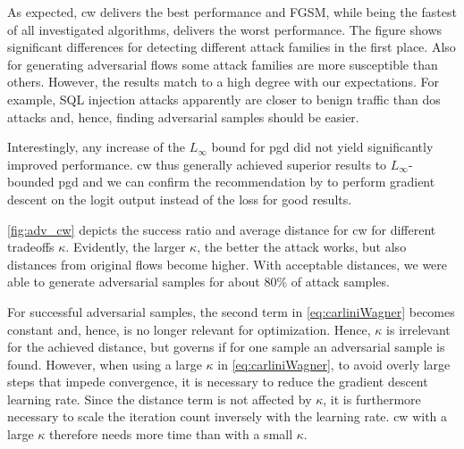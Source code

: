 \documentclass[conference]{IEEEtran}
\begin{document}
As expected, \gls{cw} delivers the best performance and FGSM, while being the fastest of all investigated algorithms, delivers the worst performance.
The figure shows significant differences for detecting different attack families in the first place. Also for generating adversarial flows some attack families are more susceptible than others. However, the results match to a high degree with our expectations. For example, SQL injection attacks apparently are closer to benign traffic than \gls{dos} attacks and, hence, finding adversarial samples should be easier.

Interestingly, any increase of the $L_\infty$ bound for \gls{pgd} did not yield significantly improved performance. 
\gls{cw} thus generally achieved superior results to $L_\infty$-bounded \gls{pgd}
and we can confirm the recommendation by \cite{carlini_towards_2017} to perform gradient descent on the logit output instead of the loss for good results.

\autoref{fig:adv_cw} depicts the success ratio and average distance for \gls{cw} for different tradeoffs $\kappa$.
Evidently, the larger $\kappa$, the better the attack works, but also distances from original flows become higher. With acceptable distances, we were able to generate adversarial samples for about 80\% of attack samples.

For successful adversarial samples, the second term in \autoref{eq:carliniWagner} becomes constant and, hence, is no longer relevant for optimization. Hence, $\kappa$ is irrelevant for the achieved distance, but governs if for one sample an adversarial sample is found.
However, when using a large $\kappa$ in \autoref{eq:carliniWagner}, to avoid overly large steps that impede convergence, it is necessary to reduce the gradient descent learning rate. Since the distance term is not affected by $\kappa$, it is furthermore necessary to scale the iteration count inversely with the learning rate. \gls{cw} with a large $\kappa$ therefore needs more time than with a small $\kappa$.


\end{document}
